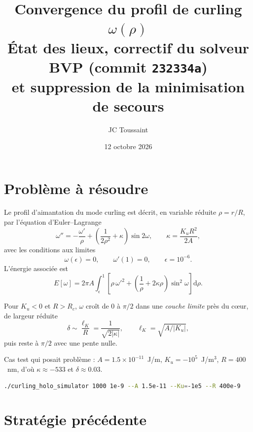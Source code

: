\documentclass[11pt,a4paper]{article}
\title{Convergence du profil de curling $\omega(\rho)$\\[0.3em]
\large État des lieux, correctif du solveur BVP (commit \texttt{232334a})\\
et suppression de la minimisation de secours}
\author{JC Toussaint}
\date{12 octobre 2026}
\newcommand{\dd}{\mathrm{d}}
\begin{document}
\maketitle

\section{Problème à résoudre}

Le profil d'aimantation du mode curling est décrit, en variable réduite
$\rho = r/R$, par l'équation d'Euler--Lagrange
\begin{equation}
  \omega'' = -\frac{\omega'}{\rho}
  + \left(\frac{1}{2\rho^{2}} + \kappa\right)\sin 2\omega,
  \qquad
  \kappa = \frac{K_u R^{2}}{2A},
  \label{eq:EL}
\end{equation}
avec les conditions aux limites
\begin{equation}
  \omega(\epsilon) = 0, \qquad \omega'(1) = 0, \qquad \epsilon = 10^{-6}.
\end{equation}
L'énergie associée est
\begin{equation}
  E[\omega] = 2\pi A \int_{\epsilon}^{1}
  \left[\rho\,\omega'^{2}
  + \left(\frac{1}{\rho} + 2\kappa\rho\right)\sin^{2}\omega\right]\dd\rho .
\end{equation}

Pour $K_u<0$ et $R>R_c$, $\omega$ croît de $0$ à $\pi/2$ dans une
\emph{couche limite} près du cœur, de largeur réduite
\begin{equation}
  \delta \sim \frac{\ell_K}{R} = \frac{1}{\sqrt{2|\kappa|}},
  \qquad \ell_K = \sqrt{A/|K_u|},
\end{equation}
puis reste à $\pi/2$ avec une pente nulle.

Cas test qui posait problème :
$A = 1.5\times10^{-11}$~J/m, $K_u = -10^{5}$~J/m$^{3}$, $R = 400$~nm,
d'où $\kappa \approx -533$ et $\delta \approx 0.03$.

\begin{lstlisting}[language=bash]
./curling_holo_simulator 1000 1e-9 --A 1.5e-11 --Ku=-1e5 --R 400e-9
\end{lstlisting}

\section{Stratégie précédente}
\end{document}
